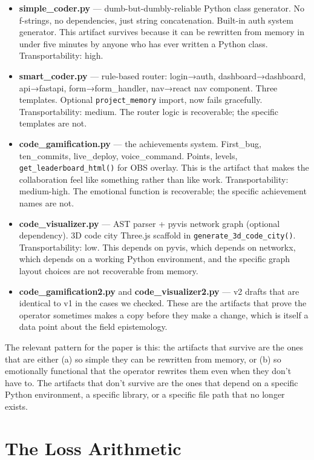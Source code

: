 \documentclass[10pt,twocolumn]{article}
\begin{document}
\begin{itemize}
  \item \textbf{simple\_coder.py} — dumb-but-dumbly-reliable Python class generator. No f-strings, no dependencies, just string concatenation. Built-in auth system generator. This artifact survives because it can be rewritten from memory in under five minutes by anyone who has ever written a Python class. Transportability: high.
  \item \textbf{smart\_coder.py} — rule-based router: login→auth, dashboard→dashboard, api→fastapi, form→form\_handler, nav→react nav component. Three templates. Optional \texttt{project\_memory} import, now fails gracefully. Transportability: medium. The router logic is recoverable; the specific templates are not.
  \item \textbf{code\_gamification.py} — the achievements system. First\_bug, ten\_commits, live\_deploy, voice\_command. Points, levels, \texttt{get\_leaderboard\_html()} for OBS overlay. This is the artifact that makes the collaboration feel like something rather than like work. Transportability: medium-high. The emotional function is recoverable; the specific achievement names are not.
  \item \textbf{code\_visualizer.py} — AST parser + pyvis network graph (optional dependency). 3D code city Three.js scaffold in \texttt{generate\_3d\_code\_city()}. Transportability: low. This depends on pyvis, which depends on networkx, which depends on a working Python environment, and the specific graph layout choices are not recoverable from memory.
  \item \textbf{code\_gamification2.py} and \textbf{code\_visualizer2.py} — v2 drafts that are identical to v1 in the cases we checked. These are the artifacts that prove the operator sometimes makes a copy before they make a change, which is itself a data point about the field epistemology.
\end{itemize}

The relevant pattern for the paper is this: the artifacts that survive are the ones that are either (a) so simple they can be rewritten from memory, or (b) so emotionally functional that the operator rewrites them even when they don't have to. The artifacts that don't survive are the ones that depend on a specific Python environment, a specific library, or a specific file path that no longer exists.

\section{The Loss Arithmetic}
\end{document}
